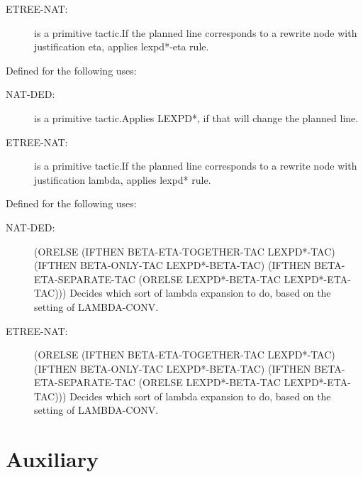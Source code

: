 \begin{description}
\begin{description}
\item[ETREE-NAT:]  is a primitive tactic.If the planned line corresponds to a rewrite node with justification
eta, applies lexpd*-eta rule.

\end{description}

\item[LEXPD*-TAC]  Defined for the following uses:
\begin{description}
\item[NAT-DED:]  is a primitive tactic.Applies LEXPD*, if that will change the planned line.

\item[ETREE-NAT:]  is a primitive tactic.If the planned line corresponds to a rewrite node with justification
lambda, applies lexpd* rule.

\end{description}

\item[LEXPD*-VARY-TAC]  Defined for the following uses:
\begin{description}
\item[NAT-DED:] 
(ORELSE (IFTHEN BETA-ETA-TOGETHER-TAC LEXPD*-TAC)
 (IFTHEN BETA-ONLY-TAC LEXPD*-BETA-TAC)
 (IFTHEN BETA-ETA-SEPARATE-TAC (ORELSE LEXPD*-BETA-TAC LEXPD*-ETA-TAC)))
Decides which sort of lambda expansion to do, based
on the setting of LAMBDA-CONV.

\item[ETREE-NAT:] 
(ORELSE (IFTHEN BETA-ETA-TOGETHER-TAC LEXPD*-TAC)
 (IFTHEN BETA-ONLY-TAC LEXPD*-BETA-TAC)
 (IFTHEN BETA-ETA-SEPARATE-TAC (ORELSE LEXPD*-BETA-TAC LEXPD*-ETA-TAC)))
Decides which sort of lambda expansion to do, based
on the setting of LAMBDA-CONV.

\end{description}

\item
\end{description}

\section{Auxiliary}

